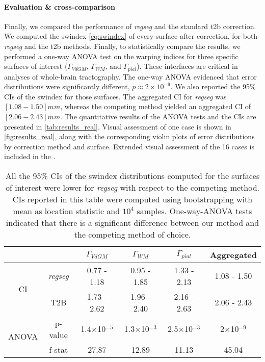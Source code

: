\paragraph*{Evaluation \& cross-comparison}\label{sec:res_cc_evaluation}
%
Finally, we compared the performance of \emph{regseg} and the standard \gls*{t2b}
  correction.
We computed the \gls*{swindex} \eqref{eq:swindex} of every surface after correction,
  for both \emph{regseg} and the \gls*{t2b} methods.
Finally, to statistically compare the results, we performed a one-way ANOVA test
  on the warping indices for three specific surfaces of interest
  ($\Gamma_{VdGM}$, $\Gamma_{WM}$, and $\Gamma_{pial}$).
These interfaces are critical in analyses of whole-brain tractography.
The one-way ANOVA evidenced that error distributions were significantly different,
  $p \approx 2 \times 10^{-9}$.
We also reported the 95\% CIs of the \gls*{swindex} for those surfaces.
The aggregated CI for \emph{regseg} was $[1.08 - 1.50] mm$, whereas the competing method
  yielded an aggregated CI of $[2.06 - 2.43] mm$.
The quantitative results of the ANOVA tests and the CIs are presented in \autoref{tab:results_real}.
Visual assessment of one case is shown in \autoref{fig:results_real}, along with the corresponding
  violin plots of error distributions by correction method and surface.
Extended visual assessment of the 16 cases is included in the .

\begin{table}
		\centering
		\footnotesize
		\tabcolsep=0.05cm
    \begin{tabular}{cccccc}
    & & $\Gamma_{VdGM}$  & $\Gamma_{WM}$ & $\Gamma_{pial}$ & Aggregated \\
    \hline
    \multirow{2}{*}{CI}
       & \emph{regseg}        & 0.77 - 1.18 & 0.95 - 1.85 & 1.33 - 2.13 & 1.08 - 1.50 \\
       & T2B                  & 1.73 - 2.62 & 1.96 - 2.40 & 2.16 - 2.63 & 2.06 - 2.43 \\
    \hline
    \multirow{2}{*}{ANOVA}
       & p-value  & 1.4$\times$10$^{-5}$& 1.3$\times$10$^{-3}$& 2.5$\times$10$^{-3}$ & 2$\times$10$^{-9}$ \\
       & f-stat   & 27.87               & 12.89               & 11.13                & 45.04 \\
    \hline
    \end{tabular}
    \caption{All the 95\% CIs of the \gls*{swindex} distributions computed for the
      surfaces of interest were lower for \emph{regseg} with respect to the competing
      method.
    CIs reported in this table were computed using bootstrapping with mean as location
      statistic and $10^4$ samples.
    One-way-ANOVA tests indicated that there is a significant difference between our method and
      the competing method of choice.
    }\label{tab:results_real}
\end{table}

